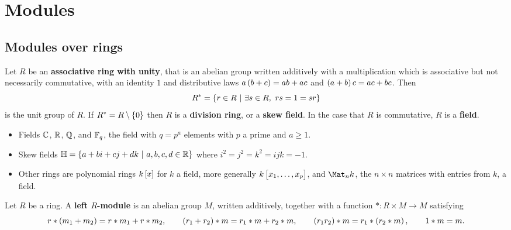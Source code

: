 \def\module{M4P63 Algebra IV}
\def\lecturer{Dr John Britnell}
\def\term{Spring 2020}
\def\cover{}
\def\syllabus{}
\def\thm{section}







\setcounter{section}{0}

\section{Modules}

\subsection{Modules over rings}


Let $ R $ be an \textbf{associative ring with unity}, that is an abelian group written additively with a multiplication which is associative but not necessarily commutative, with an identity $ 1 $ and distributive laws $ a\br{b + c} = ab + ac $ and $ \br{a + b}c = ac + bc $. Then
$$ R^* = \cbr{r \in R \st \exists s \in R, \ rs = 1 = sr} $$
is the unit group of $ R $. If $ R^* = R \setminus \cbr{0} $ then $ R $ is a \textbf{division ring}, or a \textbf{skew field}. In the case that $ R $ is commutative, $ R $ is a \textbf{field}.

\begin{example*}
\hfill
\begin{itemize}
\item Fields $ \mathbb{C} $, $ \mathbb{R} $, $ \mathbb{Q} $, and $ \mathbb{F}_q $, the field with $ q = p^a $ elements with $ p $ a prime and $ a \ge 1 $.
\item Skew fields $ \HH = \cbr{a + bi + cj + dk \st a, b, c, d \in \RR} $ where $ i^2 = j^2 = k^2 = ijk = -1 $.
\item Other rings are polynomial rings $ k\sbr{x} $ for $ k $ a field, more generally $ k\sbr{x_1, \dots, x_p} $, and $ \Mat_n k $, the $ n \times n $ matrices with entries from $ k $, a field.
\end{itemize}
\end{example*}

\begin{definition}
Let $ R $ be a ring. A \textbf{left $ R $-module} is an abelian group $ M $, written additively, together with a function $ * : R \times M \to M $ satisfying
$$ r * \br{m_1 + m_2} = r * m_1 + r * m_2, \qquad \br{r_1 + r_2} * m = r_1 * m + r_2 * m, \qquad \br{r_1r_2} * m = r_1 * \br{r_2 * m}, \qquad 1 * m = m. $$
\end{definition}

